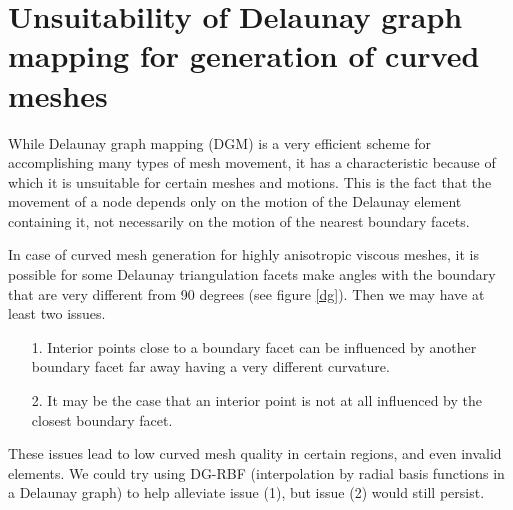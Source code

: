 \documentclass{article}
\begin{document}
\section*{\centering Unsuitability of Delaunay graph mapping for generation of curved meshes}	
While Delaunay graph mapping (DGM) is a very efficient scheme for accomplishing many types of mesh movement, it has a characteristic because of which it is unsuitable for certain meshes and motions. This is the fact that the movement of a node depends only on the motion of the Delaunay element containing it, not necessarily on the motion of the nearest boundary facets.

In case of curved mesh generation for highly anisotropic viscous meshes, it is possible for some Delaunay triangulation facets make angles with the boundary that are very different from 90 degrees (see figure \ref{dg}). Then we may have at least two issues.
\begin{itemize}
\item[1.] Interior points close to a boundary facet can be influenced by another boundary facet far away having a very different curvature.
\item[2.] It may be the case that an interior point is not at all influenced by the closest boundary facet.
\end{itemize}
These issues lead to low curved mesh quality in certain regions, and even invalid elements. We could try using DG-RBF (interpolation by radial basis functions in a Delaunay graph) to help alleviate issue (1), but issue (2) would still persist.
\end{document}
